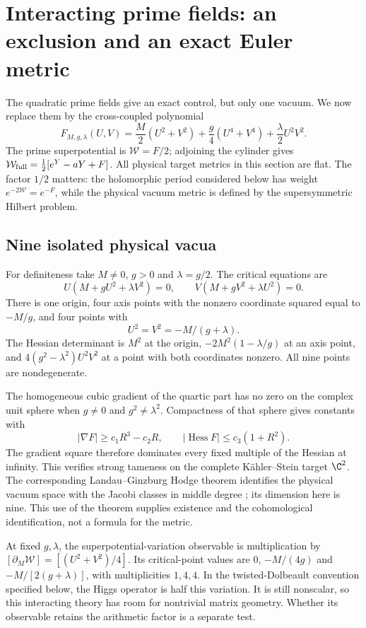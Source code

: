 \section{Interacting prime fields: an exclusion and an exact Euler metric}
\label{sec:quartic}
The quadratic prime fields give an exact control, but only one vacuum. We now replace them by the cross-coupled polynomial
\begin{equation}\label{qua:potential}
F_{M,g,\lambda}(U,V)=\frac M2(U^2+V^2)+\frac g4(U^4+V^4)
+\frac\lambda2U^2V^2.
\end{equation}
The prime superpotential is $\mathcal W=F/2$; adjoining the cylinder gives
$\mathcal W_{\rm full}=\tfrac12[e^Y-aY+F]$. All physical target metrics in this section are flat. The factor $1/2$ matters: the holomorphic period considered below has weight $e^{-2\mathcal W}=e^{-F}$, while the physical vacuum metric is defined by the supersymmetric Hilbert problem.

\subsection{Nine isolated physical vacua}
For definiteness take $M\ne0$, $g>0$ and $\lambda=g/2$. The critical equations are
\[
U(M+gU^2+\lambda V^2)=0,\qquad
V(M+gV^2+\lambda U^2)=0.
\]
There is one origin, four axis points with the nonzero coordinate squared equal to $-M/g$, and four points with
\[
U^2=V^2=-M/(g+\lambda).
\]
The Hessian determinant is $M^2$ at the origin,
$-2M^2(1-\lambda/g)$ at an axis point, and
$4(g^2-\lambda^2)U^2V^2$ at a point with both coordinates nonzero. All nine points are nondegenerate.

The homogeneous cubic gradient of the quartic part has no zero on the complex unit sphere when $g\ne0$ and $g^2\ne\lambda^2$. Compactness of that sphere gives constants with
\[
|\nabla F|\ge c_1R^3-c_2R,\qquad
|\operatorname{Hess}F|\le c_3(1+R^2).
\]
The gradient square therefore dominates every fixed multiple of the Hessian at infinity. This verifies strong tameness on the complete K\"ahler--Stein target $\C^2$. The corresponding Landau--Ginzburg Hodge theorem identifies the physical vacuum space with the Jacobi classes in middle degree \cite{Fan}; its dimension here is nine. This use of the theorem supplies existence and the cohomological identification, not a formula for the metric.

At fixed $g,\lambda$, the superpotential-variation observable is multiplication by
$[\partial_M\mathcal W]=[(U^2+V^2)/4]$. Its critical-point values are
$0$, $-M/(4g)$ and $-M/[2(g+\lambda)]$, with multiplicities $1,4,4$. In the twisted-Dolbeault convention specified below, the Higgs operator is half this variation. It is still nonscalar, so this interacting theory has room for nontrivial matrix geometry. Whether its observable retains the arithmetic factor is a separate test.

